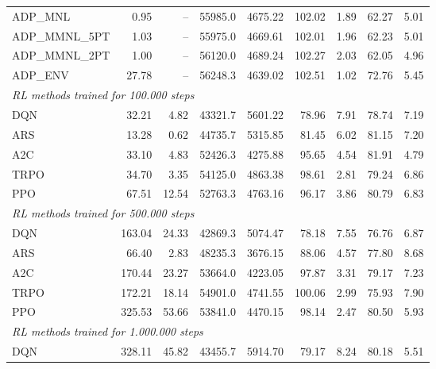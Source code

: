 \begin{samepage}
\begin{center}
\begin{tabular}{l|rr|rr|rr|rr}
    \midrule
    ADP\_MNL     &     0.95 &    -- &    55985.0 &    4675.22 &  102.02 &    1.89 &   62.27 &    5.01 \\
    ADP\_MMNL\_5PT &     1.03 &    -- &    55975.0 &    4669.61 &  102.01 &    1.96 &   62.23 &    5.01 \\
    ADP\_MMNL\_2PT &     1.00 &    -- &    56120.0 &    4689.24 &  102.27 &    2.03 &   62.05 &    4.96 \\
    ADP\_ENV     &    27.78 &    -- &    56248.3 &    4639.02 &  102.51 &    1.02 &   72.76 &    5.45 \\
    \midrule
    \multicolumn{9}{l}{\textit{RL methods trained for 100.000 steps}} \\
    \midrule
    DQN          &    32.21 &     4.82 &    43321.7 &    5601.22 &   78.96 &    7.91 &   78.74 &    7.19 \\
    ARS          &    13.28 &     0.62 &    44735.7 &    5315.85 &   81.45 &    6.02 &   81.15 &    7.20 \\
    A2C          &    33.10 &     4.83 &    52426.3 &    4275.88 &   95.65 &    4.54 &   81.91 &    4.79 \\
    TRPO         &    34.70 &     3.35 &    54125.0 &    4863.38 &   98.61 &    2.81 &   79.24 &    6.86 \\
    PPO          &    67.51 &    12.54 &    52763.3 &    4763.16 &   96.17 &    3.86 &   80.79 &    6.83 \\
    \midrule
    \multicolumn{9}{l}{\textit{RL methods trained for 500.000 steps}} \\
    \midrule
    DQN          &   163.04 &    24.33 &    42869.3 &    5074.47 &   78.18 &    7.55 &   76.76 &    6.87 \\
    ARS          &    66.40 &     2.83 &    48235.3 &    3676.15 &   88.06 &    4.57 &   77.80 &    8.68 \\
    A2C          &   170.44 &    23.27 &    53664.0 &    4223.05 &   97.87 &    3.31 &   79.17 &    7.23 \\
    TRPO         &   172.21 &    18.14 &    54901.0 &    4741.55 &  100.06 &    2.99 &   75.93 &    7.90 \\
    PPO          &   325.53 &    53.66 &    53841.0 &    4470.15 &   98.14 &    2.47 &   80.50 &    5.93 \\
    \midrule
    \multicolumn{9}{l}{\textit{RL methods trained for 1.000.000 steps}} \\
    \midrule
    DQN          &   328.11 &    45.82 &    43455.7 &    5914.70 &   79.17 &    8.24 &   80.18 &    5.51 \\

\end{tabular}
\end{center}
\end{samepage}
